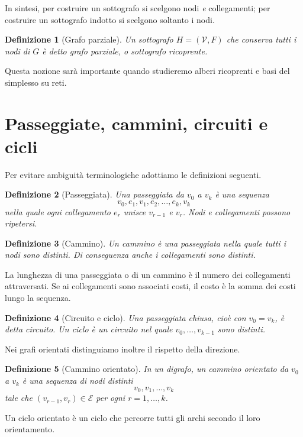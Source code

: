 \documentclass[11pt,a4paper]{article}
\newtheorem{definition}{Definizione}[section]
\newcommand{\V}{\mathcal{V}}
\newcommand{\E}{\mathcal{E}}
\begin{document}
In sintesi, per costruire un sottografo si scelgono nodi \emph{e} collegamenti; per costruire un sottografo indotto si scelgono soltanto i nodi.

\begin{definition}[Grafo parziale]
Un sottografo $H=(\V,F)$ che conserva tutti i nodi di $G$ è detto grafo parziale, o sottografo ricoprente.
\end{definition}

Questa nozione sarà importante quando studieremo alberi ricoprenti e basi del simplesso su reti.

\section{Passeggiate, cammini, circuiti e cicli}

Per evitare ambiguità terminologiche adottiamo le definizioni seguenti.

\begin{definition}[Passeggiata]
Una passeggiata da $v_0$ a $v_k$ è una sequenza
\[
v_0,e_1,v_1,e_2,\ldots,e_k,v_k
\]
nella quale ogni collegamento $e_r$ unisce $v_{r-1}$ e $v_r$. Nodi e collegamenti possono ripetersi.
\end{definition}

\begin{definition}[Cammino]
Un cammino è una passeggiata nella quale tutti i nodi sono distinti. Di conseguenza anche i collegamenti sono distinti.
\end{definition}

La lunghezza di una passeggiata o di un cammino è il numero dei collegamenti attraversati. Se ai collegamenti sono associati costi, il costo è la somma dei costi lungo la sequenza.

\begin{definition}[Circuito e ciclo]
Una passeggiata chiusa, cioè con $v_0=v_k$, è detta circuito. Un ciclo è un circuito nel quale $v_0,\ldots,v_{k-1}$ sono distinti.
\end{definition}

Nei grafi orientati distinguiamo inoltre il rispetto della direzione.

\begin{definition}[Cammino orientato]
In un digrafo, un cammino orientato da $v_0$ a $v_k$ è una sequenza di nodi distinti
\[
v_0,v_1,\ldots,v_k
\]
tale che $(v_{r-1},v_r)\in\E$ per ogni $r=1,\ldots,k$.
\end{definition}

Un ciclo orientato è un ciclo che percorre tutti gli archi secondo il loro orientamento.
\end{document}
